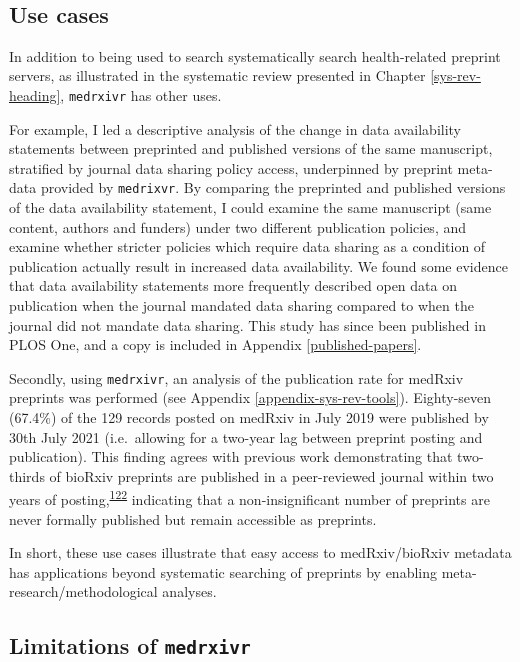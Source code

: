\documentclass[a4paper, twoside]{templates/ociamthesis}
\begin{document}
~

\hypertarget{use-cases}{%
\subsection{Use cases}\label{use-cases}}

In addition to being used to search systematically search health-related preprint servers, as illustrated in the systematic review presented in Chapter \ref{sys-rev-heading}, \texttt{medrxivr} has other uses.

For example, I led a descriptive analysis of the change in data availability statements between preprinted and published versions of the same manuscript, stratified by journal data sharing policy access, underpinned by preprint meta-data provided by \texttt{medrixvr}. By comparing the preprinted and published versions of the data availability statement, I could examine the same manuscript (same content, authors and funders) under two different publication policies, and examine whether stricter policies which require data sharing as a condition of publication actually result in increased data availability. We found some evidence that data availability statements more frequently described open data on publication when the journal mandated data sharing compared to when the journal did not mandate data sharing. This study has since been published in PLOS One, and a copy is included in Appendix \ref{published-papers}.

Secondly, using \texttt{medrxivr}, an analysis of the publication rate for medRxiv preprints was performed (see Appendix \ref{appendix-sys-rev-tools}). Eighty-seven (67.4\%) of the 129 records posted on medRxiv in July 2019 were published by 30th July 2021 (i.e.~allowing for a two-year lag between preprint posting and publication). This finding agrees with previous work demonstrating that two-thirds of bioRxiv preprints are published in a peer-reviewed journal within two years of posting,\textsuperscript{\protect\hyperlink{ref-abdill2019b}{122}} indicating that a non-insignificant number of preprints are never formally published but remain accessible as preprints.

In short, these use cases illustrate that easy access to medRxiv/bioRxiv metadata has applications beyond systematic searching of preprints by enabling meta-research/methodological analyses.

\hypertarget{medrxivr-limitations}{%
\subsection{\texorpdfstring{Limitations of \texttt{medrxivr}}{Limitations of medrxivr}}\label{medrxivr-limitations}}
\end{document}
